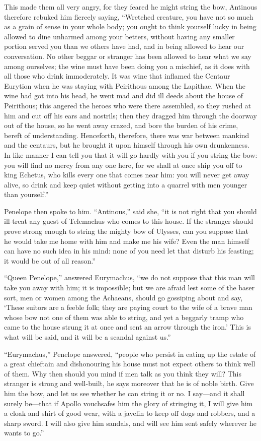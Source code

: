 This made them all very angry, for they feared he might string the bow,
Antinous therefore rebuked him fiercely saying, “Wretched creature, you have
not so much as a grain of sense in your whole body; you ought to think yourself
lucky in being allowed to dine unharmed among your betters, without having any
smaller portion served you than we others have had, and in being allowed to
hear our conversation. No other beggar or stranger has been allowed to hear
what we say among ourselves; the wine must have been doing you a mischief, as
it does with all those who drink immoderately. It was wine that inflamed the
Centaur Eurytion when he was staying with Peirithous among the Lapithae. When
the wine had got into his head, he went mad and did ill deeds about the house
of Peirithous; this angered the heroes who were there assembled, so they rushed
at him and cut off his ears and nostrils; then they dragged him through the
doorway out of the house, so he went away crazed, and bore the burden of his
crime, bereft of understanding. Henceforth, therefore, there was war between
mankind and the centaurs, but he brought it upon himself through his own
drunkenness. In like manner I can tell you that it will go hardly with you if
you string the bow: you will find no mercy from any one here, for we shall at
once ship you off to king Echetus, who kills every one that comes near him: you
will never get away alive, so drink and keep quiet without getting into a
quarrel with men younger than yourself.”

Penelope then spoke to him. “Antinous,” said she, “it is not right that you
should ill-treat any guest of Telemachus who comes to this house. If the
stranger should prove strong enough to string the mighty bow of Ulysses, can
you suppose that he would take me home with him and make me his wife? Even the
man himself can have no such idea in his mind: none of you need let that
disturb his feasting; it would be out of all reason.”

“Queen Penelope,” answered Eurymachus, “we do not suppose that this man will
take you away with him; it is impossible; but we are afraid lest some of the
baser sort, men or women among the Achaeans, should go gossiping about and say,
‘These suitors are a feeble folk; they are paying court to the wife of a brave
man whose bow not one of them was able to string, and yet a beggarly tramp who
came to the house strung it at once and sent an arrow through the iron.’ This
is what will be said, and it will be a scandal against us.”

“Eurymachus,” Penelope answered, “people who persist in eating up the estate of
a great chieftain and dishonouring his house must not expect others to think
well of them. Why then should you mind if men talk as you think they will? This
stranger is strong and well-built, he says moreover that he is of noble birth.
Give him the bow, and let us see whether he can string it or no. I say—and it
shall surely be—that if Apollo vouchsafes him the glory of stringing it, I will
give him a cloak and shirt of good wear, with a javelin to keep off dogs and
robbers, and a sharp sword. I will also give him sandals, and will see him sent
safely wherever he wants to go.”


